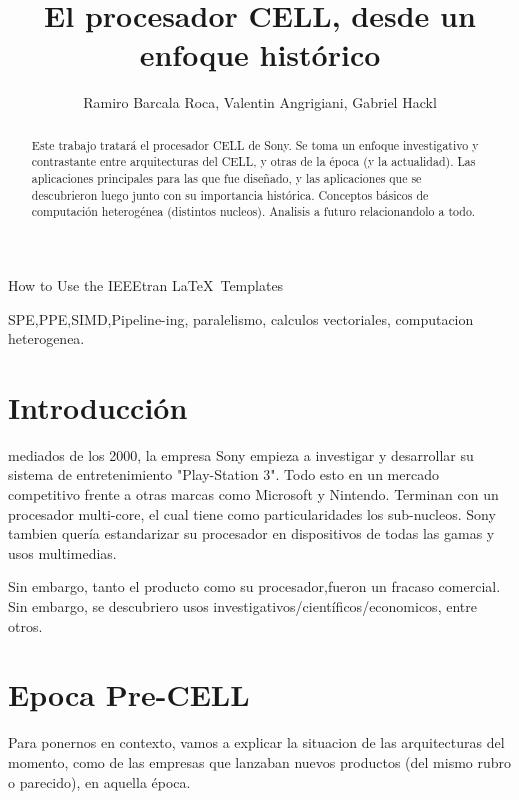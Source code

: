 \documentclass[11pt,compsoc]{IEEEtran}
\begin{document}
	\title{El procesador CELL, desde un enfoque
		histórico}
	\author{Ramiro Barcala Roca, Valentin Angrigiani, Gabriel Hackl}
		
	{How to Use the IEEEtran \LaTeX \ Templates}
	\maketitle
	
	\begin{abstract}
		Este trabajo tratará el procesador CELL de Sony. Se toma un enfoque investigativo y contrastante entre arquitecturas del CELL, y otras de la época (y la actualidad). Las aplicaciones principales para las que fue diseñado, y las aplicaciones que se descubrieron luego junto  con su importancia histórica. Conceptos básicos de computación heterogénea (distintos nucleos). Analisis a futuro relacionandolo a todo.
	\end{abstract}
	
	\begin{IEEEkeywords}
		SPE,PPE,SIMD,Pipeline-ing, paralelismo, calculos vectoriales, computacion heterogenea.
	\end{IEEEkeywords}
	
	\section{Introducción}
	 mediados de los 2000, la empresa Sony empieza a investigar y desarrollar su sistema de entretenimiento "Play-Station 3". Todo esto en un mercado competitivo frente a otras marcas como Microsoft y Nintendo. Terminan con un procesador multi-core, el cual tiene como particularidades los sub-nucleos. Sony tambien quería estandarizar su procesador en dispositivos de todas las gamas y usos multimedias.
	
	Sin embargo, tanto el producto como su procesador,fueron un fracaso comercial. Sin embargo, se descubriero usos investigativos/científicos/economicos, entre otros.
	
	
	\section{Epoca Pre-CELL}
	\noindent Para ponernos en contexto, vamos a explicar la situacion de las arquitecturas del momento, como de las empresas que lanzaban nuevos productos (del mismo rubro o parecido), en aquella época.
	
\end{document}
